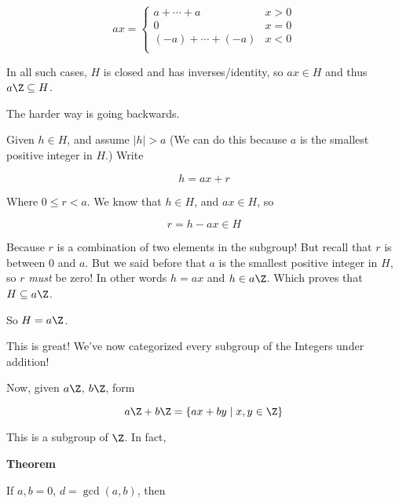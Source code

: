 \documentclass[12pt]{article}
\begin{document}
\[
	ax = \begin{cases}
		a + \cdots + a       & x > 0 \\
		0                    & x = 0 \\
		(-a) + \cdots + (-a) & x < 0 \\
	\end{cases}
\]

In all such cases, $H$ is closed and has inverses/identity, so $ax \in H$ and
thus $a\Z \subseteq H$.

The harder way is going backwards.

Given $h \in H$, and assume $|h| > a$ (We can do this because $a$ is the
smallest positive integer in $H$.) Write

\[
	h = ax + r
\]

Where $0 \le r < a$. We know that $h \in H$, and $ax \in H$, so

\[
	r = h - ax \in H
\]

Because $r$ is a combination of two elements in the subgroup! But recall that
$r$ is between $0$ and $a$. But we said before that $a$ is the smallest positive
integer in $H$, so $r$ {\it must} be zero! In other words $h = ax$ and $h \in
	a\Z$. Which proves that $H \subseteq a\Z$.

So $H = a\Z$.


This is great! We've now categorized every subgroup of the Integers under
addition!

Now, given $a\Z$, $b\Z$, form

\[
	a\Z + b\Z = \{ax + by \mid x, y \in \Z \}
\]

This is a subgroup of $\Z$. In fact,

{\bf Theorem}



If $a, b = 0$, $d = \gcd(a, b)$, then
\end{document}
